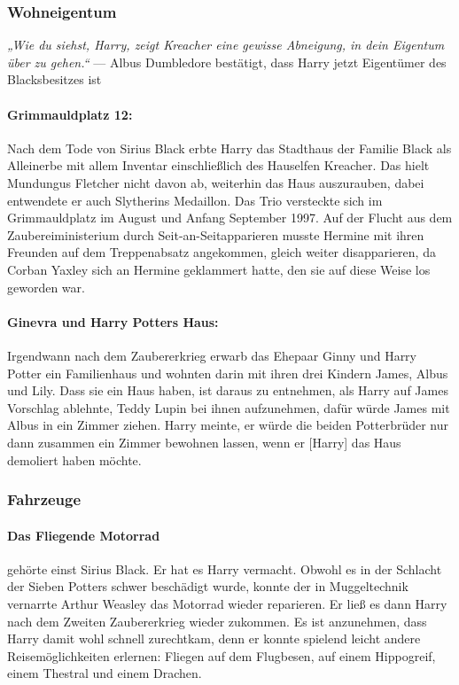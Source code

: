 \documentclass[a4paper, 10pt]{article}
\begin{document}
\subsubsection*{\large Wohneigentum}
\textit{„Wie du siehst, Harry, zeigt Kreacher eine gewisse Abneigung, in dein Eigentum über zu gehen.“}
\vspace{10pt}
\newline
{}  
— Albus Dumbledore bestätigt, dass Harry jetzt Eigentümer des Blacksbesitzes ist
\vspace{10pt}
\newline
{}  
\paragraph{Grimmauldplatz 12:}

Nach dem Tode von Sirius Black erbte Harry das Stadthaus der Familie Black als Alleinerbe mit allem Inventar einschließlich des Hauselfen Kreacher. Das hielt Mundungus Fletcher nicht davon ab, weiterhin das Haus auszurauben, dabei entwendete er auch Slytherins Medaillon. Das Trio versteckte sich im Grimmauldplatz im August und Anfang September 1997. Auf der Flucht aus dem Zaubereiministerium durch Seit-an-Seitapparieren musste Hermine mit ihren Freunden auf dem Treppenabsatz angekommen, gleich weiter disapparieren, da Corban Yaxley sich an Hermine geklammert hatte, den sie auf diese Weise los geworden war.

\paragraph{Ginevra und Harry Potters Haus:}
Irgendwann nach dem Zaubererkrieg erwarb das Ehepaar Ginny und Harry Potter ein Familienhaus und wohnten darin mit ihren drei Kindern James, Albus und Lily. Dass sie ein Haus haben, ist daraus zu entnehmen, als Harry auf James Vorschlag ablehnte, Teddy Lupin bei ihnen aufzunehmen, dafür würde James mit Albus in ein Zimmer ziehen. Harry meinte, er würde die beiden Potterbrüder nur dann zusammen ein Zimmer bewohnen lassen, wenn er [Harry] das Haus demoliert haben möchte.
\subsubsection*{\large Fahrzeuge}
\paragraph{Das Fliegende Motorrad}
gehörte einst Sirius Black. Er hat es Harry vermacht. Obwohl es in der Schlacht der Sieben Potters schwer beschädigt wurde, konnte der in Muggeltechnik vernarrte Arthur Weasley das Motorrad wieder reparieren. Er ließ es dann Harry nach dem Zweiten Zaubererkrieg wieder zukommen. Es ist anzunehmen, dass Harry damit wohl schnell zurechtkam, denn er konnte spielend leicht andere Reisemöglichkeiten erlernen: Fliegen auf dem Flugbesen, auf einem Hippogreif, einem Thestral und einem Drachen.
\end{document}
